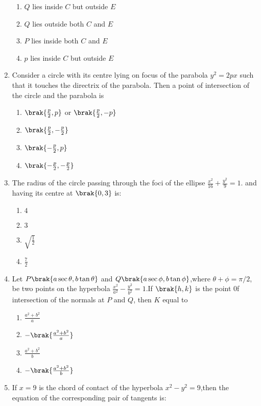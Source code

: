 \begin{enumerate}
\begin{enumerate}
    \item $Q$ lies inside $C$ but outside $E$
    \item $Q$ lies outside both $C$ and $E$
    \item $P$ lies inside both $C$ and $E$
    \item $p$ lies inside $C$ but outside $E$ 
\end{enumerate}
\item Consider a circle with its centre lying on focus of the parabola $y^2=2px$ such that it touches the directrix of the parabola. Then a point of intersection of the circle and the parabola is
        \hfill{}
\begin{enumerate}
    \item $\brak{\frac{p}{2},p}$ or $\brak{\frac{p}{2},-p}$
    \item $\brak{\frac{p}{2},-\frac{p}{2}}$
    \item $\brak{-\frac{p}{2},p}$
    \item $\brak{-\frac{p}{2},-\frac{p}{2}}$
\end{enumerate}
\item The radius of the circle passing through the foci of the ellipse $\frac{x^2}{16}+\frac{y^2}{9}=1$. and having its centre at $\brak{0,3}$ is:
       \hfill {}
\begin{enumerate}
    \item $4$
    \item $3$
    \item $\sqrt{\frac{1}{2}}$
    \item $\frac{7}{2}$
\end{enumerate}
\item Let $P\brak{a\sec\theta,b\tan\theta}$ and $Q\brak{a\sec\phi,b\tan \phi}$,where $\theta+\phi=\pi/2$, be two points on the hyperbola $\frac{x^2}{a^2}-\frac{y^2}{b^2}=1$.If $\brak{h,k}$ is the point 0f intersection of the normals at $P$ and $Q$, then $K$ equal to 
      \hfill {}
\begin{enumerate}
    \item $\frac{a^2+b^2}{a}$
    \item $-\brak{\frac{a^2+b^2}{a}}$
    \item $\frac{a^2+b^2}{b}$
    \item $-\brak{\frac{a^2+b^2}{b}}$
\end{enumerate}
\item If $x=9$ is the chord of contact of the hyperbola $x^2-y^2=9$,then the equation of the corresponding pair of tangents is:

\end{enumerate}
